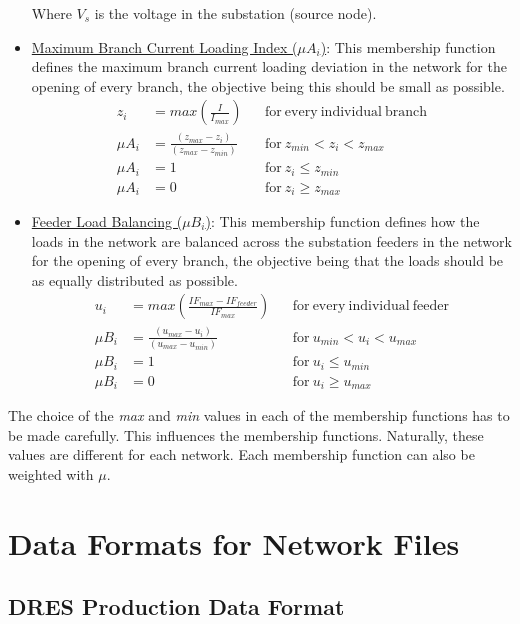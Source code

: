 \begin{itemize}
Where $V_s$ is the voltage in the substation (source node).\\
\newpage
\item \underline{Maximum Branch Current Loading Index ($\mu A_i$)}: This membership function defines the maximum branch current loading deviation in the network for the opening of every branch, the objective being this should be small as possible.
\begin{align*} 
z_i &= max\left(\frac{I}{I_{max}}\right) & &\mathrm{for\ every\ individual\ branch}\\
\mu A_i &= \frac{(z_{max}-z_i)}{(z_{max}-z_{min})} & &\mathrm{for}\ z_{min}<z_i<z_{max}\\
\mu A_i &=1 & &\mathrm{for}\ z_i\le z_{min}\\
\mu A_i &=0 & &\mathrm{for}\ z_i\ge z_{max}
\end{align*} 
\item \underline{Feeder Load Balancing ($\mu B_i$)}: This membership function defines how the loads in the network are balanced across the substation feeders in the network for the opening of every branch, the objective being that the loads should be as equally distributed as possible.
\begin{align*} 
u_i &= max\left(\frac{IF_{max}-IF_{feeder}}{IF_{max}}\right) & &\mathrm{for\ every\ individual\ feeder}\\
\mu B_i &= \frac{(u_{max}-u_i)}{(u_{max}-u_{min})} & &\mathrm{for}\ u_{min}<u_i<u_{max}\\
\mu B_i &=1 & &\mathrm{for}\ u_i\le u_{min}\\
\mu B_i &=0 & &\mathrm{for}\ u_i\ge u_{max}
\end{align*} 
\end{itemize}
The choice of the \emph{max} and \emph{min} values in each of the membership functions has to be made carefully. This influences the membership functions. Naturally, these values are different for each network. Each membership function can also be weighted with $\mu$.\\


\section*{Data Formats for Network Files}

\subsection*{DRES Production Data Format}

